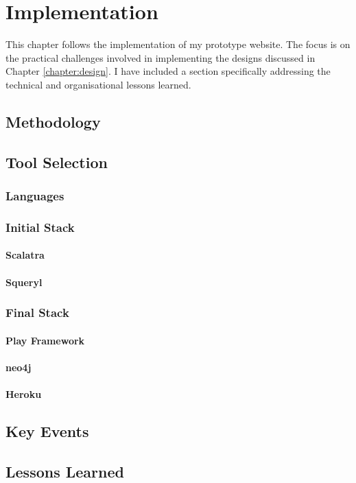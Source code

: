 \chapter{Implementation}
\label{chapter:implementation}
  This chapter follows the implementation of my prototype website. The focus is on the practical challenges involved in implementing the designs discussed in Chapter \ref{chapter:design}. I have included a section specifically addressing the technical and organisational lessons learned.

  \section{Methodology}
  \section{Tool Selection}
    \subsection{Languages}
    \subsection{Initial Stack}
      \subsubsection{Scalatra}
      \subsubsection{Squeryl}
    \subsection{Final Stack}
      \subsubsection{Play Framework}
      \subsubsection{neo4j}
      \subsubsection{Heroku}
  \section{Key Events}
  \section{Lessons Learned}
